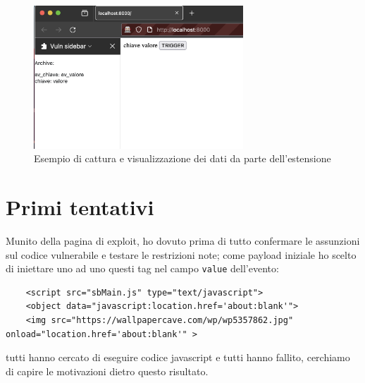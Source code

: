 \documentclass{sapthesis}
\newcommand{\code}[1]{\texttt{#1}}
\begin{document}
        \begin{figure}[ht]
            \centering                                                  
            \includegraphics[width=0.7\textwidth]{sidebar-key-value-example.png}
            \caption{ Esempio di cattura e visualizzazione dei dati da parte dell'estensione }
            \label{fig:sidebar-key-value-example}                             
        \end{figure}

    \section{Primi tentativi}
    \label{sec:attaccando-vuln-tentativi}
        Munito della pagina di exploit, ho dovuto prima di tutto confermare le assunzioni sul
        codice vulnerabile e testare le restrizioni note; come payload iniziale ho scelto
        di iniettare uno ad uno questi tag nel campo \code{value} dell'evento:
        \begin{lstlisting}
    <script src="sbMain.js" type="text/javascript">
    <object data="javascript:location.href='about:blank'">
    <img src="https://wallpapercave.com/wp/wp5357862.jpg" onload="location.href='about:blank'" >
\end{lstlisting}
        tutti hanno cercato di eseguire codice javascript e tutti hanno fallito, cerchiamo di capire
        le motivazioni dietro questo risultato.
\end{document}
